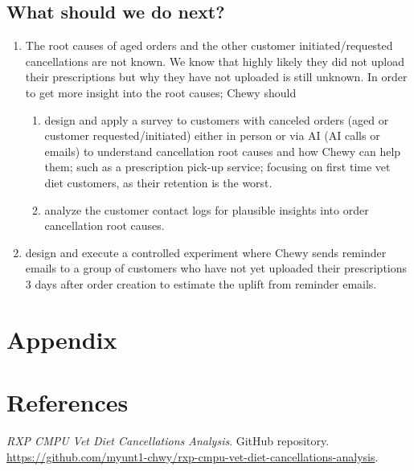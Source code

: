 \documentclass[
  10pt,
]{article}
\begin{document}
\subsection{What should we do next?}
\begin{enumerate}
\item The root causes of aged orders and the other customer
  initiated/requested cancellations are not known. We know that highly
  likely they did not upload their prescriptions but why they have not
  uploaded is still unknown. In order to get more insight into the
  root causes; Chewy should
\begin{enumerate}
\item design and apply a survey to customers with canceled orders
  (aged or customer requested/initiated) either in person or via AI
  (AI calls or emails) to understand cancellation root causes and how
  Chewy can help them; such as a prescription pick-up service;
  focusing on first time vet diet customers, as their retention is the
  worst.
\item analyze the customer contact logs for plausible insights into
  order cancellation root causes.
\end{enumerate}
\item design and execute a controlled experiment where Chewy sends
  reminder emails to a group of customers who have not yet uploaded their
  prescriptions 3 days after order creation to estimate the uplift
  from reminder emails.
\end{enumerate}
\section{Appendix}\label{appendix}
\localtableofcontents







\section{References}\label{references}
\begin{enumerate}[label={[\arabic*]},leftmargin=*]
\item \label{ref:analysis-repository}\emph{RXP CMPU Vet Diet Cancellations Analysis}. GitHub repository. \url{https://github.com/myunt1-chwy/rxp-cmpu-vet-diet-cancellations-analysis}.
\end{enumerate}
\end{document}

